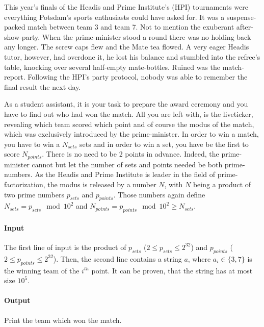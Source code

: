 



\makeheader

This year's finals of the Headis and Prime Institute's (HPI) tournaments were everything Potsdam's sports enthusiasts could have asked for.
It was a suspense-packed match between team 3 and team 7.
Not to mention the exuberant after-show-party.
When the prime-minister stood a round there was no holding back any longer.
The screw caps flew and the Mate tea flowed.
A very eager Headis tutor, however, had overdone it, he lost his balance and stumbled into the refree's table, knocking over several half-empty mate-bottles.
Ruined was the match-report.
Following the HPI's party protocol, nobody was able to remember the final result the next day.

As a student assistant, it is your task to prepare the award ceremony and you have to find out who had won the match.
All you are left with, is the liveticker, revealing which team scored which point and of course the modus of the match,
which was exclusively introduced by the prime-minister.
In order to win a match, you have to win a $N_{sets}$ sets and in order to win a set, you have be the first to score $N_{points}$.
There is no need to be 2 points in advance.
Indeed, the prime-minister cannot but let the number of sets and points needed be both prime-numbers.
As the Headis and Prime Institute is leader in the field of prime-factorization, the modus is released by a number $N$,
with $N$ being a product of two prime numbers $p_{sets}$ and $p_{points}$. Those numbers again define $N_{sets} =
p_{sets} \mod 10^{2}$ and $N_{points} = p_{points} \mod 10^{2} \geq N_{sets}$.

\paragraph*{Input}

The first line of input is the product of $p_{sets}$ ($2\leq p_{sets} \leq 2^{32}$) and $p_{points}$ ($2 \leq p_{points}
\leq 2^{32}$).
Then, the second line contains a string $a$, where $a_i \in \{3, 7\}$ is the winning team of the $i^{th}$ point.
It can be proven, that the string has at most size $10^{5}$.

\paragraph*{Output}

Print the team which won the match.


\begin{samples}
\end{samples}


